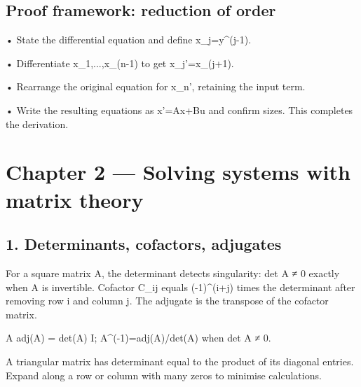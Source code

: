 \documentclass[11pt,a4paper]{article}
\begin{document}
\subsection{Proof framework: reduction of order}
\begin{studybox}• State the differential equation and define x\_j=y\textasciicircum{}(j-1).\end{studybox}
\begin{studybox}• Differentiate x\_1,...,x\_(n-1) to get x\_j'=x\_(j+1).\end{studybox}
\begin{studybox}• Rearrange the original equation for x\_n', retaining the input term.\end{studybox}
\begin{studybox}• Write the resulting equations as x'=Ax+Bu and confirm sizes. This completes the derivation.\end{studybox}

\section{Chapter 2 — Solving systems with matrix theory}

\subsection{1. Determinants, cofactors, adjugates}
\begin{conceptbox}For a square matrix A, the determinant detects singularity: det A ≠ 0 exactly when A is invertible. Cofactor C\_ij equals (-1)\textasciicircum{}(i+j) times the determinant after removing row i and column j. The adjugate is the transpose of the cofactor matrix.\end{conceptbox}
\begin{equationbox}\raggedright
{\ttfamily\small A adj(A) = det(A) I; A\textasciicircum{}(-1)=adj(A)/det(A) when det A ≠ 0.}\par
\end{equationbox}
\begin{conceptbox}A triangular matrix has determinant equal to the product of its diagonal entries. Expand along a row or column with many zeros to minimise calculations.\end{conceptbox}
\end{document}
